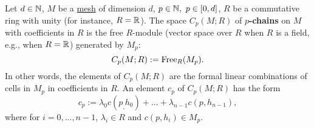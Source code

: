 \begin{definition}
  \label{idec:mesh_chain:definition}
  Let
    $d \in \mathbb{N}$,
    $M$ be a \hyperref[idec:mesh:definition]{mesh} of dimension $d$,
    $p \in \mathbb{N},\ p \in [0, d]$,
    $R$ be a commutative ring with unity (for instance, $R = \mathbb{R}$).
  The space $C_p(M; R)$ of \textbf{$p$-chains}
  on $M$ with coefficients in $R$ is the free $R$-module
  (vector space over $R$ when $R$ is a field, e.g., when $R = \mathbb{R}$)
  generated by $M_p$:
  \begin{equation}
    C_p(M; R) := {\rm Free}_R(M_p).
  \end{equation}
  In other words, the elements of $C_p(M; R)$ are the formal linear combinations
  of cells in $M_p$ in coefficients in $R$.
  An element $c_p$ of $C_p(M; R)$ has the form
  \begin{equation}
    c_p := \lambda_0 c(p_, h_0) + ... + \lambda_{n - 1} c(p, h_{n - 1}),
  \end{equation}
  where for $i = 0, ..., n - 1$, $\lambda_i \in R$ and $c(p, h_i) \in M_p$.
\end{definition}

